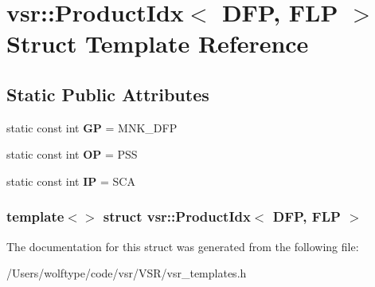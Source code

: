 \hypertarget{structvsr_1_1_product_idx_3_01_d_f_p_00_01_f_l_p_01_4}{\section{vsr\-:\-:Product\-Idx$<$ D\-F\-P, F\-L\-P $>$ Struct Template Reference}
\label{structvsr_1_1_product_idx_3_01_d_f_p_00_01_f_l_p_01_4}
}
\subsection*{Static Public Attributes}
\begin{DoxyCompactItemize}
\item 
\hypertarget{structvsr_1_1_product_idx_3_01_d_f_p_00_01_f_l_p_01_4_a529f773582f56725d560480c03eeba04}{static const int {\bfseries G\-P} = M\-N\-K\-\_\-\-D\-F\-P}\label{structvsr_1_1_product_idx_3_01_d_f_p_00_01_f_l_p_01_4_a529f773582f56725d560480c03eeba04}

\item 
\hypertarget{structvsr_1_1_product_idx_3_01_d_f_p_00_01_f_l_p_01_4_abd09b393ba22711c093b3e9e28d90d14}{static const int {\bfseries O\-P} = P\-S\-S}\label{structvsr_1_1_product_idx_3_01_d_f_p_00_01_f_l_p_01_4_abd09b393ba22711c093b3e9e28d90d14}

\item 
\hypertarget{structvsr_1_1_product_idx_3_01_d_f_p_00_01_f_l_p_01_4_afd799945a2eefaf8457db9392ca8b101}{static const int {\bfseries I\-P} = S\-C\-A}\label{structvsr_1_1_product_idx_3_01_d_f_p_00_01_f_l_p_01_4_afd799945a2eefaf8457db9392ca8b101}

\end{DoxyCompactItemize}
\subsubsection*{template$<$$>$ struct vsr\-::\-Product\-Idx$<$ D\-F\-P, F\-L\-P $>$}



The documentation for this struct was generated from the following file\-:\begin{DoxyCompactItemize}
\item 
/\-Users/wolftype/code/vsr/\-V\-S\-R/vsr\-\_\-templates.\-h\end{DoxyCompactItemize}
